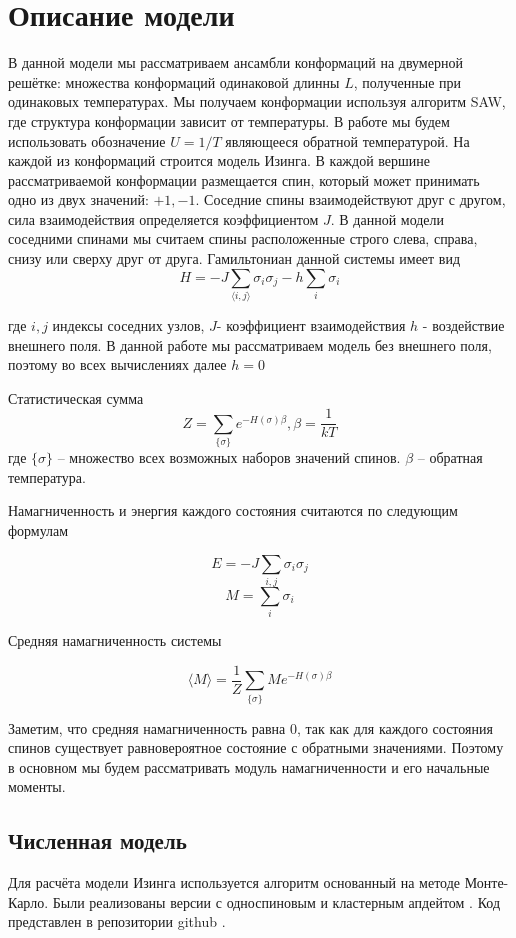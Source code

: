 \section{Описание модели}

В данной модели мы рассматриваем ансамбли конформаций на двумерной решётке: множества конформаций одинаковой длинны $L$, полученные при одинаковых температурах. Мы получаем конформации используя алгоритм SAW, где структура конформации зависит от температуры. В работе мы будем использовать обозначение $U = 1/T$ являющееся обратной температурой.
На каждой из конформаций строится модель Изинга. В каждой вершине рассматриваемой конформации размещается спин, который может принимать одно из двух значений: $+1, -1$. Соседние спины взаимодействуют друг с другом, сила взаимодействия определяется коэффициентом $J$. В данной модели соседними спинами мы считаем спины расположенные строго слева, справа, снизу или сверху друг от друга.
Гамильтониан данной системы имеет вид
\[H = -J\sum_{\langle i, j\rangle}{\sigma_i\sigma_j} - h\sum_i{\sigma_i} \]

где $i, j$ индексы соседних узлов, $J$- коэффициент взаимодействия $h$ - воздействие внешнего поля. В данной работе мы рассматриваем модель без внешнего поля, поэтому во всех вычислениях далее $h = 0$ 

Статистическая сумма
\[Z = \sum_{\{\sigma\}} e^{-H(\sigma)\beta}, \beta = \frac{1}{kT}\]
где $\{\sigma\}$ -- множество всех возможных наборов значений спинов. $\beta$ -- обратная температура.

Намагниченность и энергия каждого состояния считаются по следующим формулам

\[ 
E = -J\sum_{i, j} \sigma_i \sigma_j
\]
\[
M = \sum_i \sigma_i
\]

Средняя намагниченность системы

\[
\langle M \rangle = \frac{1}{Z}  \sum_{\{\sigma\}} M e^{-H(\sigma)\beta}
\]

Заметим, что средняя намагниченность равна 0, так как для каждого состояния спинов существует равновероятное состояние с обратными значениями. Поэтому в основном мы будем рассматривать модуль намагниченности и его начальные моменты.


\subsection{Численная модель}
Для расчёта модели Изинга используется алгоритм основанный на методе Монте-Карло. Были реализованы версии с односпиновым и кластерным апдейтом \cite{wolf_algorithm}. Код представлен в репозитории github \cite{github}. 

